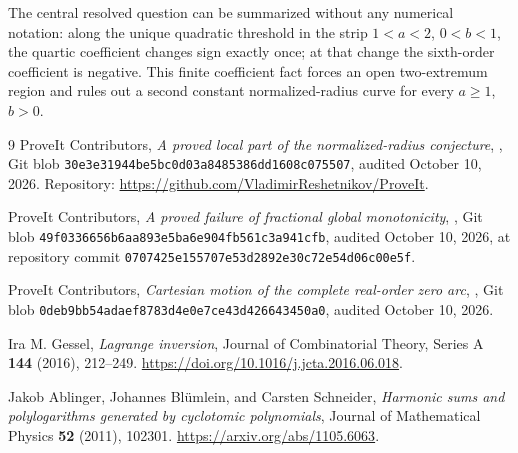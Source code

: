 \documentclass[11pt,a4paper]{article}
\theoremstyle{definition}\newtheorem{definition}[theorem]{Definition}
\theoremstyle{remark}\newtheorem{remark}[theorem]{Remark}
\numberwithin{equation}{section}
\begin{document}
The central resolved question can be summarized without any numerical
notation: along the unique quadratic threshold in the strip
$1<a<2$, $0<b<1$, the quartic coefficient changes sign exactly once;
at that change the sixth-order coefficient is negative. This finite
coefficient fact forces an open two-extremum region and rules out a second
constant normalized-radius curve for every $a\ge1$, $b>0$.

\begin{thebibliography}{9}
ProveIt Contributors,
\emph{A proved local part of the normalized-radius conjecture},
,
Git blob \texttt{30e3e31944be5bc0d03a8485386dd1608c075507},
audited October 10, 2026.
Repository: \url{https://github.com/VladimirReshetnikov/ProveIt}.

ProveIt Contributors,
\emph{A proved failure of fractional global monotonicity},
,
Git blob \texttt{49f0336656b6aa893e5ba6e904fb561c3a941cfb},
audited October 10, 2026, at repository commit
\texttt{0707425e155707e53d2892e30c72e54d06c00e5f}.

ProveIt Contributors,
\emph{Cartesian motion of the complete real-order zero arc},
,
Git blob \texttt{0deb9bb54adaef8783d4e0e7ce43d426643450a0},
audited October 10, 2026.

Ira M. Gessel,
\emph{Lagrange inversion},
Journal of Combinatorial Theory, Series A \textbf{144} (2016), 212--249.
\url{https://doi.org/10.1016/j.jcta.2016.06.018}.

Jakob Ablinger, Johannes Bl\"umlein, and Carsten Schneider,
\emph{Harmonic sums and polylogarithms generated by cyclotomic polynomials},
Journal of Mathematical Physics \textbf{52} (2011), 102301.
\url{https://arxiv.org/abs/1105.6063}.
\end{thebibliography}
\end{document}
